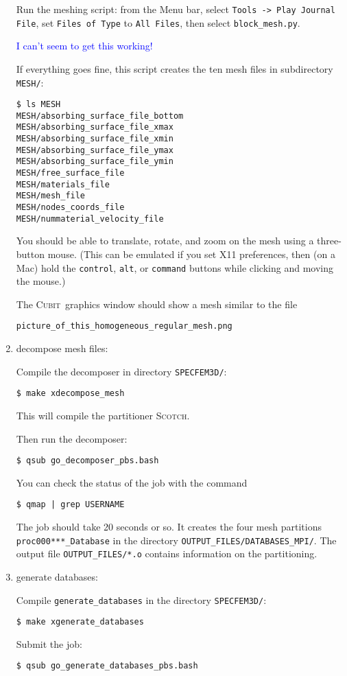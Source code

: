 \documentclass[10pt,fleqn,letterpaper]{article}
\newcommand{\cubit}{\textsc{Cubit}}
\begin{document}
\begin{enumerate}
Run the meshing script: from the Menu bar, select \verb+Tools -> Play Journal File+, set \verb+Files of Type+ to \verb+All Files+, then select \verb+block_mesh.py+. 


\textcolor{blue}{I can't seem to get this working!}

If everything goes fine, this script creates the ten mesh files in subdirectory \verb+MESH/+:
\begin{lstlisting}
$ ls MESH
MESH/absorbing_surface_file_bottom
MESH/absorbing_surface_file_xmax
MESH/absorbing_surface_file_xmin
MESH/absorbing_surface_file_ymax
MESH/absorbing_surface_file_ymin
MESH/free_surface_file
MESH/materials_file
MESH/mesh_file
MESH/nodes_coords_file
MESH/nummaterial_velocity_file
\end{lstlisting}

You should be able to translate, rotate, and zoom on the mesh using a three-button mouse. (This can be emulated if you set X11 preferences, then (on a Mac) hold the \verb+control+, \verb+alt+, or \verb+command+ buttons while clicking and moving the mouse.)

The \cubit\ graphics window should show a mesh similar to the file
\begin{verbatim}
picture_of_this_homogeneous_regular_mesh.png
\end{verbatim}

\item decompose mesh files:

Compile the decomposer in directory \verb+SPECFEM3D/+:
\begin{lstlisting}
$ make xdecompose_mesh
\end{lstlisting}
%
This will compile the partitioner \textsc{Scotch}.

Then run the decomposer:
\begin{lstlisting}
$ qsub go_decomposer_pbs.bash
\end{lstlisting}
%
You can check the status of the job with the command
%
\begin{lstlisting}
$ qmap | grep USERNAME
\end{lstlisting}
%
The job should take 20 seconds or so. It creates the four mesh partitions \verb+proc000***_Database+ in the directory \verb+OUTPUT_FILES/DATABASES_MPI/+. The output file \verb+OUTPUT_FILES/*.o+ contains information on the partitioning.

\item generate databases:

Compile \verb+generate_databases+ in the directory \verb+SPECFEM3D/+:
\begin{lstlisting}
$ make xgenerate_databases
\end{lstlisting}
Submit the job:
\begin{lstlisting}
$ qsub go_generate_databases_pbs.bash
\end{lstlisting}


\end{enumerate}
\end{document}
